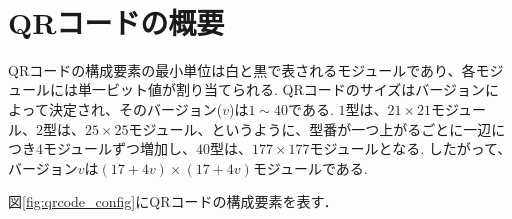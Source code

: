 \documentclass{thesis}
\begin{document}








\section{QRコードの概要}

QRコードの構成要素の最小単位は白と黒で表されるモジュールであり、各モジュールには単一ビット値が割り当てられる.
QRコードのサイズはバージョンによって決定され、そのバージョン($v$)は$1\sim40$である.
$1$型は、$21\times21$モジュール、$2$型は、$25\times25$モジュール、というように、型番が一つ上がるごとに一辺につき$4$モジュールずつ増加し、$40$型は、$177\times177$モジュールとなる.
したがって、バージョン$v$は$(17+4v)\times(17+4v)$モジュールである.

図\ref{fig:qrcode_config}にQRコードの構成要素を表す． \\
\end{document}
